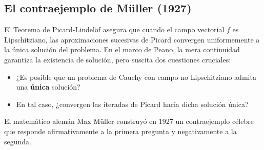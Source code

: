 \subsection{El contraejemplo de Müller (1927)}

El Teorema de Picard-Lindelöf asegura que cuando el campo vectorial $f$ es Lipschitziano, las aproximaciones sucesivas de Picard convergen uniformemente a la única solución del problema. En el marco de Peano, la mera continuidad garantiza la existencia de solución, pero suscita dos cuestiones cruciales:
\begin{itemize}
    \item ¿Es posible que un problema de Cauchy con campo no Lipschitziano admita una \textbf{única} solución?
    \item En tal caso, ¿convergen las iteradas de Picard hacia dicha solución única?
\end{itemize}

El matemático alemán Max Müller construyó en 1927 un contraejemplo célebre que responde afirmativamente a la primera pregunta y negativamente a la segunda.

